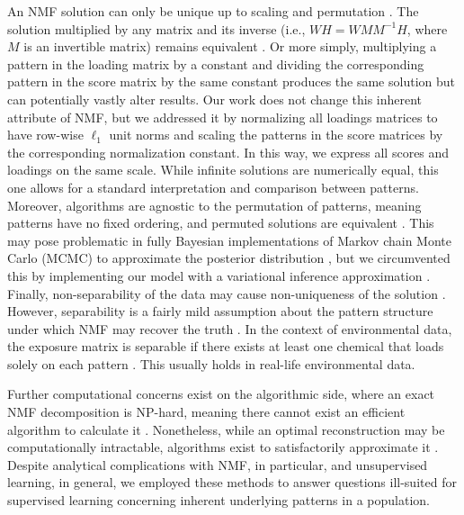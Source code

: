 An NMF solution can only be unique up to scaling and permutation \citep{eggert2004sparse}. The solution multiplied by any matrix and its inverse (i.e., $W H = W M M^{-1} H$, where $M$ is an invertible matrix) remains equivalent \citep{xu2003document}. Or more simply, multiplying a pattern in the loading matrix by a constant and dividing the corresponding pattern in the score matrix by the same constant produces the same solution but can potentially vastly alter results. Our work does not change this inherent attribute of NMF, but we addressed it by normalizing all loadings matrices to have row-wise $\ell_1$ unit norms and scaling the patterns in the score matrices by the corresponding normalization constant. In this way, we express all scores and loadings on the same scale. While infinite solutions are numerically equal, this one allows for a standard interpretation and comparison between patterns. Moreover, algorithms are agnostic to the permutation of patterns, meaning patterns have no fixed ordering, and permuted solutions are equivalent \citep{celeux1998bayesian}. This may pose problematic in fully Bayesian implementations of Markov chain Monte Carlo (MCMC) to approximate the posterior distribution \citep{bda3}, but we circumvented this by implementing our model with a variational inference approximation \citep{blei2017variational}. Finally, non-separability of the data may cause non-uniqueness of the solution \citep{laurberg2008theorems}. However, separability is a fairly mild assumption about the pattern structure under which NMF may recover the truth \citep{arora2016computing}. In the context of environmental data, the exposure matrix is separable if there exists at least one chemical that loads solely on each pattern \citep{arora2012learning}. This usually holds in real-life environmental data.

Further computational concerns exist on the algorithmic side, where an exact NMF decomposition is NP-hard, meaning there cannot exist an efficient algorithm to calculate it \citep{vavasis2010complexity}. Nonetheless, while an optimal reconstruction may be computationally intractable, algorithms exist to satisfactorily approximate it \citep{gillis2020nonnegative}. Despite analytical complications with NMF, in particular, and unsupervised learning, in general, we employed these methods to answer questions ill-suited for supervised learning concerning inherent underlying patterns in a population. 


